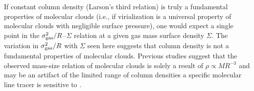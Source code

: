 \IfFileExists{emulateapjlegacy.cls}{\documentclass[iop]{emulateapjlegacy}}{\documentclass[iop]{emulateapj}}
\begin{document}
If constant column density (Larson's third relation) is truly a fundamental properties of molecular clouds %
(i.e., if virialization is a universal property of molecular clouds with negligible surface pressure), 
one would expect a single point in the $\sigma_{\rm gas}^2/R$--$\Sigma$ relation at a given gas mass surface density $\Sigma$. 
The variation in $\sigma_{\rm gas}^2/R$ with $\Sigma$ seen here suggests that column density is not a fundamental properties of 
molecular clouds. Previous studies suggest that the observed mass-size relation of molecular clouds 
is solely a result of $\rho\propto M R^{-3}$ and may be an artifact of the limited range of 
column densities a specific molecular line tracer is sensitive to \citep[see e.g.,][]{Ballesteros02a, Ballesteros11a}.
\end{document}
